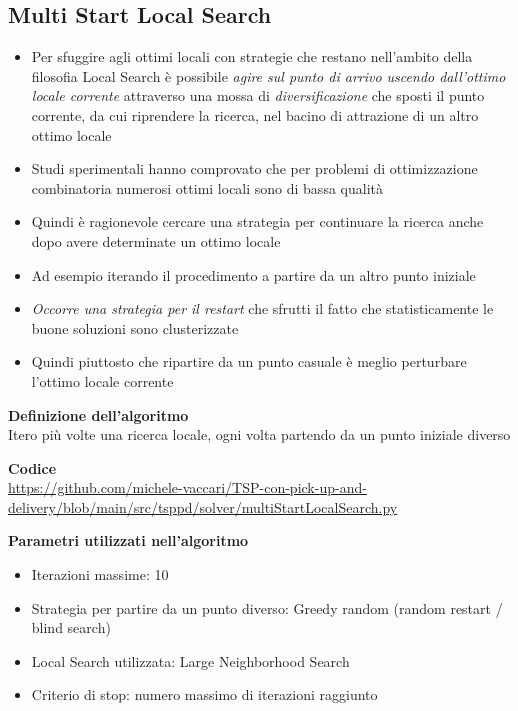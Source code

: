 \documentclass[9pt]{beamer}
\begin{document}
\subsection{Multi Start Local Search}
\begin{frame}[allowframebreaks]{\subsecname}

	\begin{itemize}
	
		\item
		Per sfuggire agli ottimi locali con strategie che restano nell’ambito della filosofia Local Search è possibile \emph{agire sul punto di arrivo uscendo dall’ottimo locale corrente} attraverso una mossa di \emph{diversificazione} che sposti il punto corrente, da cui riprendere la ricerca, nel bacino di attrazione di un altro ottimo locale

		\item
		Studi sperimentali hanno comprovato che per problemi di ottimizzazione combinatoria numerosi ottimi locali sono di bassa qualità

		\item
		Quindi è ragionevole cercare una strategia per continuare la ricerca anche dopo avere determinate un ottimo locale

		\item
		Ad esempio iterando il procedimento a partire da un altro punto iniziale

		\item
		\emph{Occorre una strategia per il restart} che sfrutti il fatto che statisticamente le buone soluzioni sono clusterizzate

		\item
		Quindi piuttosto che ripartire da un punto casuale è meglio perturbare l’ottimo locale corrente
		
	\end{itemize}

\framebreak

	\textbf{Definizione dell'algoritmo} \\
	Itero più volte una ricerca locale, ogni volta partendo da un punto iniziale diverso

	\textbf{Codice} \\
	\href{https://github.com/michele-vaccari/TSP-con-pick-up-and-delivery/blob/main/src/tsppd/solver/multiStartLocalSearch.py}{https://github.com/michele-vaccari/TSP-con-pick-up-and-delivery/blob/main/src/tsppd/solver/multiStartLocalSearch.py}

	\textbf{Parametri utilizzati nell'algoritmo}
	\begin{itemize}
		\item
		Iterazioni massime: 10
		\item
		Strategia per partire da un punto diverso: Greedy random (random restart / blind search)
		\item
		Local Search utilizzata: Large Neighborhood Search
		\item
		Criterio di stop: numero massimo di iterazioni raggiunto
	\end{itemize}


\end{frame}
\end{document}
